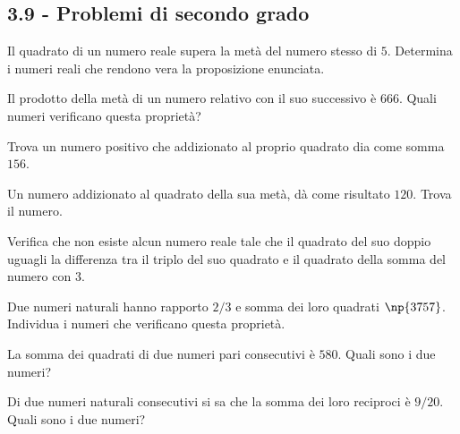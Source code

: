 \begin{multicols}{2}
\subsection*{3.9 - Problemi di secondo grado}

\begin{esercizio}[\Ast]
 \label{ese:3.112}
Il quadrato di un numero reale supera la metà del numero stesso di $ 5 $.
Determina i numeri reali che rendono vera la proposizione enunciata.
\end{esercizio}

\begin{esercizio}[\Ast]
 \label{ese:3.113}
Il prodotto della metà di un numero relativo con il suo successivo è $ 666 $.
Quali numeri verificano questa proprietà?
\end{esercizio}

\begin{esercizio}
 \label{ese:3.114}
Trova un numero positivo che addizionato al proprio quadrato dia come somma $ 156 $.
\end{esercizio}

\begin{esercizio}
 \label{ese:3.115}
Un numero addizionato al quadrato della sua metà, dà come risultato $ 120 $.
Trova il numero.
\end{esercizio}

\begin{esercizio}
 \label{ese:3.116}
Verifica che non esiste alcun numero reale tale che il quadrato del suo
doppio uguagli la differenza tra il triplo del suo quadrato e il quadrato
della somma del numero con $3$.
\end{esercizio}

\begin{esercizio}[\Ast]
 \label{ese:3.117}
Due numeri naturali hanno rapporto $2/3$ e somma dei loro quadrati $\np{3757}$.
Individua i numeri che verificano questa proprietà.
\end{esercizio}

\begin{esercizio}[\Ast]
 \label{ese:3.118}
La somma dei quadrati di due numeri pari consecutivi è $ 580 $. Quali sono i
due numeri?
\end{esercizio}

\begin{esercizio}[\Ast]
 \label{ese:3.119}
Di due numeri naturali consecutivi si sa che la somma dei loro reciproci
è $ 9/20 $. Quali sono i due numeri?
\end{esercizio}


\end{multicols}
